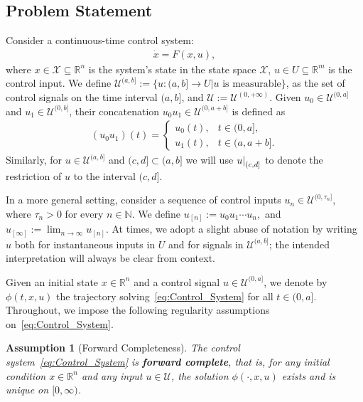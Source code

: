 \documentclass[letterpaper, 10 pt, conference]{ieeeconf}
\newtheorem{assumption}{Assumption}
\newcommand{\U}{\mathcal{U}}
\newcommand\restr[2]{{%
  \left.\kern-\nulldelimiterspace %
  #1 %
  \littletaller %
  \right|_{#2} %
  }}
\newcommand{\littletaller}{\mathchoice{\vphantom{\big|}}{}{}{}}
\begin{document}
\subsection{Problem Statement}
\label{sec:problem statement}
Consider a continuous-time control system:
\begin{align}
    \dot{x} = F(x,u),
    \label{eq:Control_System}
\end{align}
where $x \in \mathcal{X} \subseteq \mathbb{R}^{n}$ is the system's state in the state space $\mathcal{X}$, $u \in U \subseteq \mathbb{R}^m$ is the control input. We define $\mathcal{U}^{(a, b]} := \{u: (a,b] \rightarrow U| u \text{ is measurable}\}$, as the set of control signals on the time interval $(a,b]$, and $\mathcal{U} := \mathcal{U}^{(0,+\infty)}$. Given $u_0 \in \mathcal{U}^{(0,a]}$ and $u_1 \in \mathcal{U}^{(0, b]}$, their concatenation $u_0u_1 \in \mathcal{U}^{(0, a+b]}$ is defined as
\begin{align*}
    (u_0u_1)(t) = \begin{cases}
u_0(t), & t \in (0,a], \\
u_1(t), & t \in (a,a+b].
\end{cases}
\end{align*}
Similarly, for $u\in\U^{(a,b]}$ and $(c,d]\subset(a,b]$ we will use $\restr{u}{(c,d]}$ to denote the restriction of $u$ to the interval $(c,d]$.

In a more general setting, consider a sequence of control inputs $u_n \in \mathcal{U}^{(0,\tau_n]}$, where $\tau_n > 0$ for every $n \in \mathbb{N}$. We define $ u_{[n]} := u_0 u_1 \cdots u_n,$ and $  u_{[\infty]} := \lim_{n \to \infty} u_{[n]}$. At times, we adopt a slight abuse of notation by writing $u$ both for instantaneous inputs in $U$ and for signals in $\mathcal{U}^{(a,b]}$; the intended interpretation will always be clear from context.

Given an initial state $x \in \mathbb{R}^n$ and a control signal $u \in \mathcal{U}^{(0,a]}$, we denote by $\phi(t,x,u)$ the trajectory solving~\eqref{eq:Control_System} for all $t \in (0,a]$. Throughout, we impose the following regularity assumptions on~\eqref{eq:Control_System}.

\begin{assumption}[Forward Completeness]\label{ass:forward}
The control system~\eqref{eq:Control_System} is \textbf{forward complete}, 
that is, for any initial condition $x \in \mathbb{R}^n$ and any input $u \in \mathcal{U}$, 
the solution $\phi(\cdot,x,u)$ exists and is unique on $[0,\infty)$.
\end{assumption}
\end{document}
